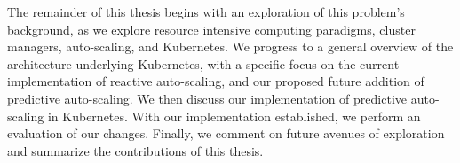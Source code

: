 The remainder of this thesis begins with an exploration of this problem's
background, as we explore resource intensive computing paradigms, cluster
managers, auto-scaling, and Kubernetes. We progress to a general overview of the
architecture underlying Kubernetes, with a specific focus on the current
implementation of reactive auto-scaling, and our proposed future addition of
predictive auto-scaling. We then discuss our implementation of predictive
auto-scaling in Kubernetes. With our implementation established, we perform an
evaluation of our changes. Finally, we comment on future avenues of exploration
and summarize the contributions of this thesis.

